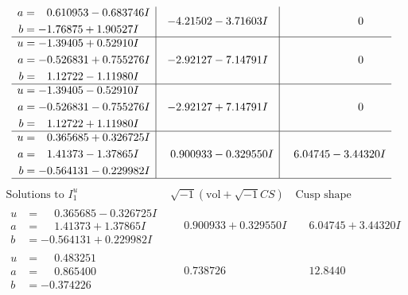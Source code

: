 \documentclass[1p]{elsarticle_modified}
\theoremstyle{definition}
\newcommand{\I}{\sqrt{-1}}
\begin{document}
$$\begin{array}{c|c|c}
\begin{aligned}
a &= \phantom{-}0.610953 - 0.683746 I \\
b &= -1.76875 + 1.90527 I\end{aligned}
 & -4.21502 - 3.71603 I & \phantom{-0.000000 } 0 \\ \hline\begin{aligned}
u &= -1.39405 + 0.52910 I \\
a &= -0.526831 + 0.755276 I \\
b &= \phantom{-}1.12722 - 1.11980 I\end{aligned}
 & -2.92127 - 7.14791 I & \phantom{-0.000000 } 0 \\ \hline\begin{aligned}
u &= -1.39405 - 0.52910 I \\
a &= -0.526831 - 0.755276 I \\
b &= \phantom{-}1.12722 + 1.11980 I\end{aligned}
 & -2.92127 + 7.14791 I & \phantom{-0.000000 } 0 \\ \hline\begin{aligned}
u &= \phantom{-}0.365685 + 0.326725 I \\
a &= \phantom{-}1.41373 - 1.37865 I \\
b &= -0.564131 - 0.229982 I\end{aligned}
 & \phantom{-}0.900933 - 0.329550 I & \phantom{-}6.04745 - 3.44320 I\\
 \hline 
 \end{array}$$\newpage$$\begin{array}{c|c|c}  
\text{Solutions to }I^u_{1}& \I (\text{vol} + \sqrt{-1}CS) & \text{Cusp shape}\\
 \hline 
\begin{aligned}
u &= \phantom{-}0.365685 - 0.326725 I \\
a &= \phantom{-}1.41373 + 1.37865 I \\
b &= -0.564131 + 0.229982 I\end{aligned}
 & \phantom{-}0.900933 + 0.329550 I & \phantom{-}6.04745 + 3.44320 I \\ \hline\begin{aligned}
u &= \phantom{-}0.483251\phantom{ +0.000000I} \\
a &= \phantom{-}0.865400\phantom{ +0.000000I} \\
b &= -0.374226\phantom{ +0.000000I}\end{aligned}
 & \phantom{-}0.738726\phantom{ +0.000000I} & \phantom{-}12.8440\phantom{ +0.000000I} \\ \hline\begin{aligned}

\end{aligned}
\end{array}$$
\end{document}
